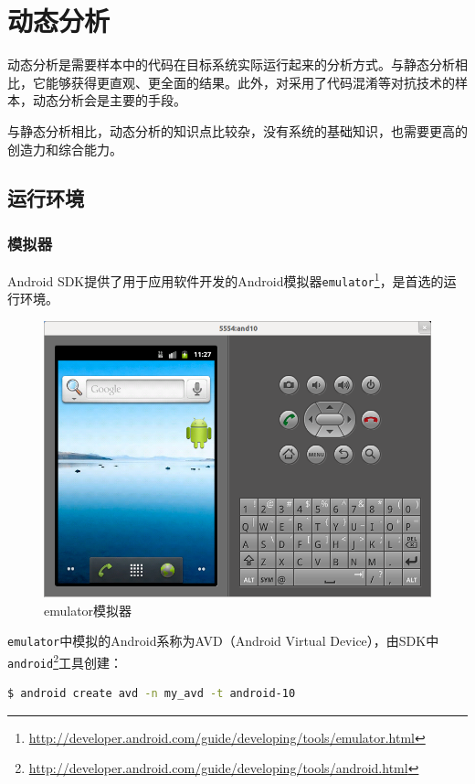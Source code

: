 \chapter{动态分析}
动态分析是需要样本中的代码在目标系统实际运行起来的分析方式。与静态分析相比，它能够获得更直观、更全面的结果。此外，对采用了代码混淆等对抗技术的样本，动态分析会是主要的手段。

与静态分析相比，动态分析的知识点比较杂，没有系统的基础知识，也需要更高的创造力和综合能力。

\section{运行环境}
\subsection{模拟器}
Android SDK提供了用于应用软件开发的Android模拟器\lstinline!emulator!\footnote{\url{http://developer.android.com/guide/developing/tools/emulator.html}}，是首选的运行环境。
\begin{figure}[htbp]
  \centering
  \includegraphics[width=14cm]{image/emulator.png}
  \caption{emulator模拟器}
\end{figure}

\lstinline!emulator!中模拟的Android系称为AVD（Android Virtual Device），由SDK中\lstinline!android!\footnote{\url{http://developer.android.com/guide/developing/tools/android.html}}工具创建：
\begin{lstlisting}[language=bash, numbers=none]
 $ android create avd -n my_avd -t android-10
\end{lstlisting}

